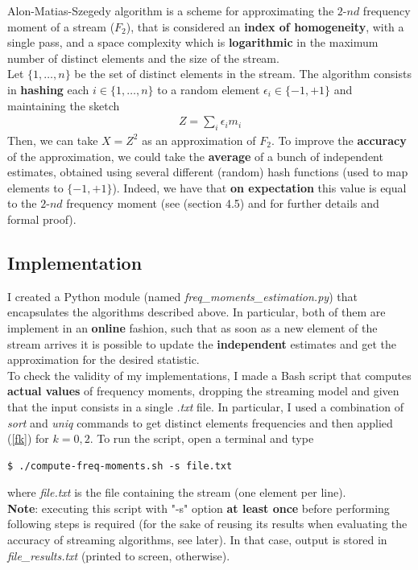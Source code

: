 Alon-Matias-Szegedy algorithm is a scheme for approximating the $2\text{-}nd$ frequency moment of a stream ($F_2$), that is considered an \textbf{index of homogeneity}, with a single pass, and a space complexity which is \textbf{logarithmic} in the maximum number of distinct elements and the size of the stream.\\
Let $\{1,\ldots,n\}$ be the set of distinct elements in the stream. The algorithm consists in \textbf{hashing} each $i \in \{1,\ldots,n\}$ to a random element $\epsilon_i \in \{-1,+1\}$ and maintaining the sketch
\begin{align*}
	Z = \sum_{i} \epsilon_i m_i
\end{align*}
Then, we can take $X = Z^2$ as an approximation of $F_2$. To improve the \textbf{accuracy} of the approximation, we could take the \textbf{average} of a bunch of independent estimates, obtained using several different (random) hash functions (used to map elements to $\{-1,+1\}$). Indeed, we have that \textbf{on expectation} this value is equal to the $2\text{-}nd$ frequency moment (see \cite{mmd} (section 4.5) and \cite{dm-streams} for further details and formal proof).


\subsection{Implementation}

I created a Python module (named \textit{freq\_moments\_estimation.py}) that encapsulates the algorithms described above. In particular, both of them are implement in an \textbf{online} fashion, such that as soon as a new element of the stream arrives it is possible to update the \textbf{independent} estimates and get the approximation for the desired statistic.\\
To check the validity of my implementations, I made a Bash script that computes \textbf{actual values} of frequency moments, dropping the streaming model and given that the input consists in a single \textit{.txt} file. In particular, I used a combination of \textit{sort} and \textit{uniq} commands to get distinct elements frequencies and then applied (\ref{fk}) for $k = 0,2$. To run the script, open a terminal and type
\begin{lstlisting}
$ ./compute-freq-moments.sh -s file.txt
\end{lstlisting}
where \textit{file.txt} is the file containing the stream (one element per line).\\ 
\textbf{Note}: executing this script with "-s" option \textbf{at least once} before performing following steps is required (for the sake of reusing its results when evaluating the accuracy of streaming algorithms, see later). In that case, output is stored in \textit{file\_results.txt} (printed to screen, otherwise).\\

